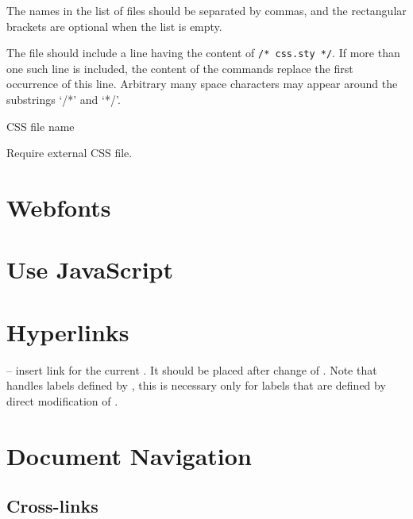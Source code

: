 \documentclass{book}
\begin{document}

The names in the list of files should be separated by commas, and the rectangular brackets are optional when the list is empty.

The file should include a line having the content of \verb|/* css.sty */|. If
more than one such line is included, the content of the  commands
replace the first occurrence of this line. Arbitrary many space characters may
appear around the substrings ‘/*’ and ‘*/’. 

 {CSS file name}\EndDoc

Require external CSS file.

\section{Webfonts}

\section{Use JavaScript}
\section{Hyperlinks}

\texcommand{\AnchorLabel} -- insert link for the current \texcommand{\label}. It should be placed after change 
of \texcommand{\@currentlabel}. Note that \texfourht{} handles labels defined by ,
this is necessary only for labels that are defined by direct modification of \texcommand{\@currentlabel}.

\section{Document Navigation}


\subsection{Cross-links}
\end{document}
